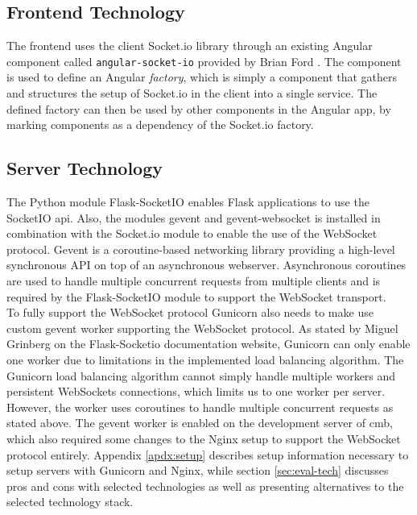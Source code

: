 \subsection{Frontend Technology}
The frontend uses the client Socket.io library \cite{SOCKETIO} through an existing Angular component called \texttt{angular-socket-io} provided by Brian Ford \cite{ANGULARSOCKETIO}. The component is used to define an Angular \textit{factory}, which is simply a component that gathers and structures the setup of Socket.io in the client into a single service. The defined factory can then be used by other components in the Angular app, by marking components as a dependency of the Socket.io factory. \\

\subsection{Server Technology}
The Python module Flask-SocketIO \cite{FLASKSOCKETIO} enables Flask applications to use the SocketIO \gls{api}. Also, the modules gevent \cite{GEVENT} and gevent-websocket \cite{GEVENTWEBSOCKET}  is installed in combination with the Socket.io module to enable the use of the WebSocket protocol. Gevent is a coroutine-based networking library providing a high-level synchronous API on top of an asynchronous webserver. Asynchronous coroutines are used to handle multiple concurrent requests from multiple clients and is required by the Flask-SocketIO module to support the WebSocket transport. \\

To fully support the WebSocket protocol Gunicorn also needs to make use custom gevent worker supporting the WebSocket protocol. As stated by Miguel Grinberg on the Flask-Socketio documentation website, Gunicorn can only enable one worker due to limitations in the implemented load balancing algorithm. The Gunicorn load balancing algorithm cannot simply handle multiple workers and persistent WebSockets connections, which limits us to one worker per server. However, the worker uses coroutines to handle multiple concurrent requests as stated above. The gevent worker is enabled on the development server of \gls{cmb}, which also required some changes to the Nginx setup to support the WebSocket protocol entirely. Appendix \ref{apdx:setup} describes setup information necessary to setup servers with Gunicorn and Nginx, while section \ref{sec:eval-tech} discusses pros and cons with selected technologies as well as presenting alternatives to the selected technology stack.

